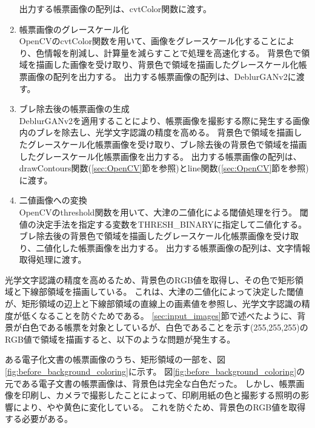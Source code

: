 \begin{enumerate}
        出力する帳票画像の配列は、cvtColor関数に渡す。
    \item 帳票画像のグレースケール化\\
        OpenCVのcvtColor関数を用いて、画像をグレースケール化することにより、色情報を削減し、計算量を減らすことで処理を高速化する。
        背景色で領域を描画した画像を受け取り、背景色で領域を描画したグレースケール化帳票画像の配列を出力する。
        出力する帳票画像の配列は、DeblurGANv2に渡す。   
    \item ブレ除去後の帳票画像の生成\\
        DeblurGANv2を適用することにより、帳票画像を撮影する際に発生する画像内のブレを除去し、光学文字認識の精度を高める。
        背景色で領域を描画したグレースケール化帳票画像を受け取り、ブレ除去後の背景色で領域を描画したグレースケール化帳票画像を出力する。
        出力する帳票画像の配列は、drawContours関数(\ref{sec:OpenCV}節を参照)とline関数(\ref{sec:OpenCV}節を参照)に渡す。
    \item 二値画像への変換\\
        OpenCVのthreshold関数を用いて、大津の二値化による閾値処理を行う。
        閾値の決定手法を指定する変数をTHRESH\_BINARYに指定して二値化する。
        ブレ除去後の背景色で領域を描画したグレースケール化帳票画像を受け取り、二値化した帳票画像を出力する。
        出力する帳票画像の配列は、文字情報取得処理に渡す。
\end{enumerate}

光学文字認識の精度を高めるため、背景色のRGB値を取得し、その色で矩形領域と下線部領域を描画している。
これは、大津の二値化によって決定した閾値が、矩形領域の辺上と下線部領域の直線上の画素値を参照し、光学文字認識の精度が低くなることを防ぐためである。
\ref{sec:input_images}節で述べたように、背景が白色である帳票を対象としているが、白色であることを示す(255,255,255)のRGB値で領域を描画すると、以下のような問題が発生する。

ある電子化文書の帳票画像のうち、矩形領域の一部を、図\ref{fig:before_background_coloring}に示す。
図\ref{fig:before_background_coloring}の元である電子文書の帳票画像は、背景色は完全な白色だった。
しかし、帳票画像を印刷し、カメラで撮影したことによって、印刷用紙の色と撮影する照明の影響により、やや黄色に変化している。
これを防ぐため、背景色のRGB値を取得する必要がある。

